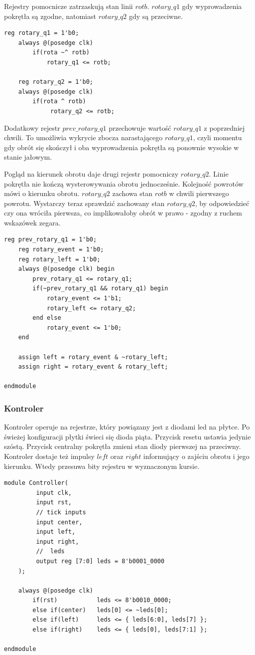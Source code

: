 \documentclass[a4paper,12pt]{article}
\begin{document}
Rejestry pomocnicze zatrzaskują stan linii $rotb$. $rotary\_q1$ gdy wyprowadzenia pokrętła są zgodne, natomiast $rotary\_q2$ gdy są przeciwne.
\begin{lstlisting}[label=Rotor,caption=Rotor.v,firstnumber=12]
    reg rotary_q1 = 1'b0;
    always @(posedge clk)
        if(rota ~^ rotb)
            rotary_q1 <= rotb;

    reg rotary_q2 = 1'b0;
    always @(posedge clk)
        if(rota ^ rotb)
             rotary_q2 <= rotb;
\end{lstlisting}

Dodatkowy rejestr $prev\_rotary\_q1$ przechowuje wartość $rotary\_q1$ z poprzedniej chwili. To umożliwia wykrycie zbocza narastającego $rotary\_q1$, czyli momentu gdy obrót się skończył i oba wyprowadzenia pokrętła są ponownie wysokie w stanie jałowym.

Pogląd na kierunek obrotu daje drugi rejestr pomocniczy $rotary\_q2$. Linie pokrętła nie kończą wysterowywania obrotu jednocześnie. Kolejność powrotów mówi o kierunku obrotu. $rotary\_q2$ zachowa stan $rotb$ w chwili pierwszego powrotu. Wystarczy teraz sprawdzić zachowany stan $rotary\_q2$, by odpowiedzieć czy ona wróciła pierwsza, co implikowałoby obrót w prawo - zgodny z ruchem wskazówek zegara.
\begin{lstlisting}[label=Rotor,caption=Rotor.v,firstnumber=22]
    reg prev_rotary_q1 = 1'b0;
    reg rotary_event = 1'b0;
    reg rotary_left = 1'b0;
    always @(posedge clk) begin
        prev_rotary_q1 <= rotary_q1;
        if(~prev_rotary_q1 && rotary_q1) begin
            rotary_event <= 1'b1;
            rotary_left <= rotary_q2;
        end else
            rotary_event <= 1'b0;
    end

    assign left = rotary_event & ~rotary_left;
    assign right = rotary_event & rotary_left;

endmodule
\end{lstlisting}

\subsubsection{Kontroler}

Kontroler operuje na rejestrze, który powiązany jest z diodami led na płytce. Po świeżej konfiguracji płytki świeci się dioda piąta. Przycisk resetu ustawia jedynie szóstą. Przycisk centralny pokrętła zmieni stan diody pierwszej na przeciwny. Kontroler dostaje też impulsy $left$ oraz $right$ informujący o zajściu obrotu i jego kierunku. Wtedy przesuwa bity rejestru w wyznaczonym kursie.
\begin{lstlisting}[label=Controller,caption=Controller.v]
module Controller(
         input clk,
         input rst,
         // tick inputs
         input center,
         input left,
         input right,
         //  leds
         output reg [7:0] leds = 8'b0001_0000
    );

    always @(posedge clk)
        if(rst)           leds <= 8'b0010_0000;
        else if(center)   leds[0] <= ~leds[0];
        else if(left)     leds <= { leds[6:0], leds[7] };
        else if(right)    leds <= { leds[0], leds[7:1] };

endmodule
\end{lstlisting}
\end{document}

